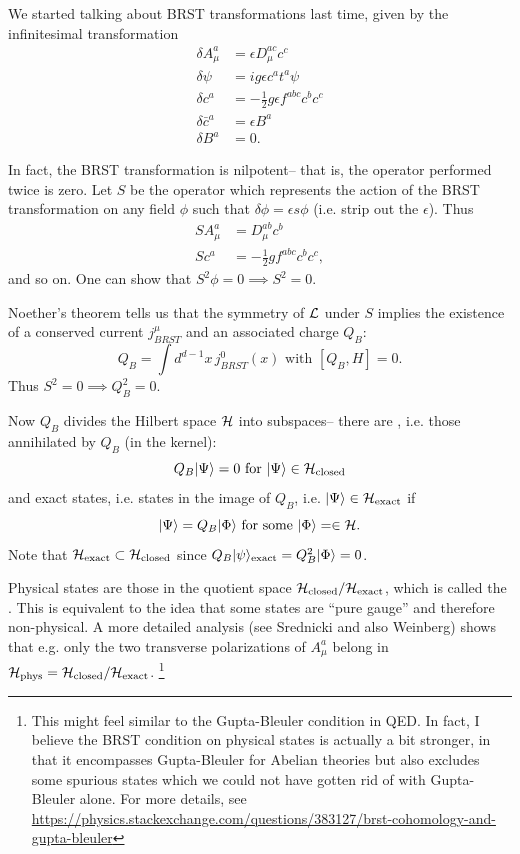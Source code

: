 We started talking about BRST transformations last time, given by the infinitesimal transformation
\begin{align*}
    \delta A_\mu^a &= \epsilon D_\mu^{ac} c^c\\
    \delta \psi &= ig \epsilon c^a t^a \psi\\
    \delta c^a &= -\frac{1}{2} g\epsilon f^{abc} c^b c^c\\
    \delta \bar c^a &= \epsilon B^a\\
    \delta B^a &= 0.
\end{align*}

In fact, the BRST transformation is nilpotent-- that is, the operator performed twice is zero. Let $S$ be the operator which represents the action of the BRST transformation on any field $\phi$ such that $\delta \phi = \epsilon s \phi$ (i.e. strip out the $\epsilon$). Thus
\begin{align}
    SA_\mu^a &= D^{ab}_\mu c^b\\
    Sc^a &= -\frac{1}{2} g f^{abc} c^b c^c,
\end{align}
and so on. One can show that $S^2\phi=0\implies S^2=0$.

Noether's theorem tells us that the symmetry of $\mathcal L$ under $S$ implies the existence of a conserved current $j^\mu_{BRST}$ and an associated charge $Q_B$:
\begin{equation}
    Q_B =\int d^{d-1}x \,j^0_{BRST}(x)\text{ with }[Q_B,H]=0.
\end{equation}
Thus $S^2=0 \implies Q_B^2=0$.

Now $Q_B$ divides the Hilbert space $\mathcal H$ into subspaces-- there are , i.e. those annihilated by $Q_B$ (in the kernel):
\begin{equation}
    Q_B \lvert\Psi\rangle=0 \text{ for }\lvert\Psi\rangle\in \mathcal H_{\text{closed}}
\end{equation}
and exact states, i.e. states in the image of $Q_B$, i.e. $\lvert\Psi\rangle\in \mathcal H_\text{exact}$ if
\begin{equation}
    \lvert\Psi\rangle = Q_B \lvert\Phi\rangle \text{ for some }\lvert\Phi\rangle =\in \mathcal H.
\end{equation}
Note that $\mathcal H_\text{exact} \subset \mathcal H_\text{closed}$ since $Q_B \lvert\psi\rangle_{\text{exact}}=Q^2_B \lvert\Phi\rangle=0$.

Physical states are those in the quotient space $\mathcal H_\text{closed}/\mathcal H_\text{exact}$, which is called the . This is equivalent to the idea that some states are ``pure gauge'' and therefore non-physical. A more detailed analysis (see Srednicki and also Weinberg) shows that e.g. only the two transverse polarizations of $A_\mu^a$ belong in $\mathcal H_\text{phys}=\mathcal H_\text{closed}/\mathcal H_\text{exact}$.%
    \footnote{This might feel similar to the Gupta-Bleuler condition in QED. In fact, I believe the BRST condition on physical states is actually a bit stronger, in that it encompasses Gupta-Bleuler for Abelian theories but also excludes some spurious states which we could not have gotten rid of with Gupta-Bleuler alone. For more details, see \url{https://physics.stackexchange.com/questions/383127/brst-cohomology-and-gupta-bleuler}}

